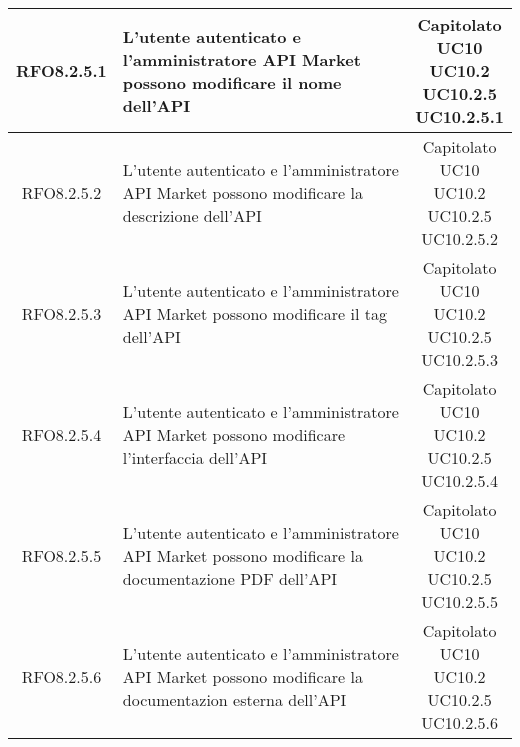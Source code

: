 \begin{longtable}{|c|p{8cm}|c|}
\hypertarget{RFO8.2.5.1}{RFO8.2.5.1} &  L'utente autenticato e l'amministratore API Market possono modificare il nome dell'API & \makecell*{Capitolato\\UC10\\UC10.2\\UC10.2.5\\UC10.2.5.1} \\
\hline

\hypertarget{RFO8.2.5.2}{RFO8.2.5.2} &  L'utente autenticato e l'amministratore API Market possono modificare la descrizione dell'API & \makecell*{Capitolato\\UC10\\UC10.2\\UC10.2.5\\UC10.2.5.2} \\
\hline

\hypertarget{RFO8.2.5.3}{RFO8.2.5.3} &  L'utente autenticato e l'amministratore API Market possono modificare il tag dell'API & \makecell*{Capitolato\\UC10\\UC10.2\\UC10.2.5\\UC10.2.5.3} \\
\hline

\hypertarget{RFO8.2.5.4}{RFO8.2.5.4} &  L'utente autenticato e l'amministratore API Market possono modificare l'interfaccia dell'API & \makecell*{Capitolato\\UC10\\UC10.2\\UC10.2.5\\UC10.2.5.4} \\
\hline

\hypertarget{RFO8.2.5.5}{RFO8.2.5.5} & L'utente autenticato e l'amministratore API Market possono modificare la documentazione PDF dell'API & \makecell*{Capitolato\\UC10\\UC10.2\\UC10.2.5\\UC10.2.5.5} \\
\hline

\hypertarget{RFO8.2.5.6}{RFO8.2.5.6} &  L'utente autenticato e l'amministratore API Market possono modificare la documentazion esterna dell'API & \makecell*{Capitolato\\UC10\\UC10.2\\UC10.2.5\\UC10.2.5.6} \\
\hline


\end{longtable}

